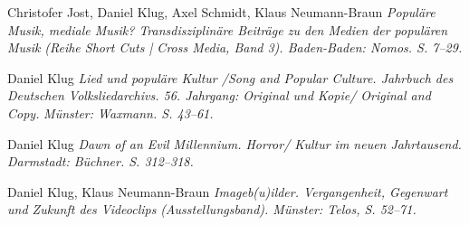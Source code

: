 \documentclass[9pt]{article}
\begin{document}
\newline{}
\newline{} 
\newline{} 
\newline\noindent Christofer Jost, Daniel Klug, Axel Schmidt, Klaus Neumann-Braun
\newline\noindent\emph{Popul\"{a}re Musik, mediale Musik? Transdisziplin\"{a}re Beitr\"{a}ge zu den Medien}
\newline\noindent\emph{der popul\"{a}ren Musik}
\newline\noindent\emph{(Reihe Short Cuts | Cross Media, Band 3). Baden-Baden: Nomos. S. 7--29.}
\bigskip


\newline{} 
\newline\noindent Daniel Klug
\newline\noindent\emph{Lied und populäre Kultur /Song and Popular Culture. Jahrbuch des}
\newline\noindent\emph{Deutschen Volksliedarchivs. 56. Jahrgang: Original und Kopie/ Original and Copy.}
\newline\noindent\emph{Münster: Waxmann. S. 43--61.}
\bigskip


\newline{} 
\newline\noindent Daniel Klug
\newline\noindent\emph{Dawn of an Evil Millennium. Horror/ Kultur im neuen Jahrtausend.}
\newline\noindent\emph{Darmstadt: Büchner. S. 312–318.}
\bigskip

\newline{} 
\newline\noindent Daniel Klug, Klaus Neumann-Braun
\newline\noindent\emph{Imageb(u)ilder. Vergangenheit, Gegenwart und Zukunft des Videoclips}
\newline\noindent\emph{(Ausstellungsband). Münster: Telos, S. 52--71.}
\bigskip
\end{document}
